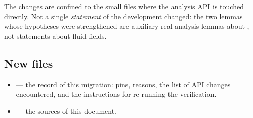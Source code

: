 The changes are confined to the small files where the \Mathlib{} analysis API is touched
directly. Not a single \emph{statement} of the development changed: the two lemmas whose
hypotheses were strengthened are auxiliary real-analysis lemmas about , not
statements about fluid fields.

\subsection*{New files}
\begin{itemize}
\item {} --- the record of this migration: pins, reasons, the list of API
      changes encountered, and the instructions for re-running the verification.
\item {} --- the sources of this document.
\end{itemize}
